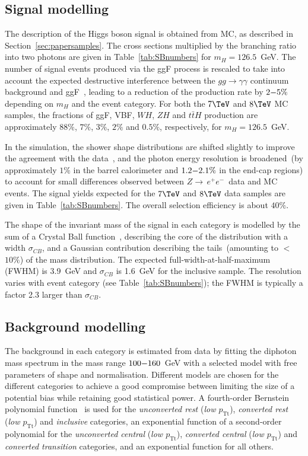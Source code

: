 \documentclass[final,3p,times,twocolumn]{elsarticle}
\newcommand{\ptt}{\ensuremath{p_{\mathrm{Tt}}}}
\newcommand{\ztoee}{\ensuremath{Z{\rightarrow\,}e^+e^-}}
\begin{document}
\subsection{Signal modelling}
The description of the Higgs boson signal is obtained from MC, as described in Section~\ref{sec:papersamples}.
The cross sections multiplied by the branching ratio into two photons are given in Table~\ref{tab:SBnumbers} for $m_H=126.5$~GeV.
The number of signal events produced via the ggF process is rescaled to take into account
the expected destructive interference between the $gg\to\gamma\gamma$\; continuum background and ggF~\cite{Dixon:2003yb},
leading to a reduction of the production rate by $2{\--}5\%$ depending on $m_H$ and the event category.
For both the $7\TeV$ and $8\TeV$ MC samples,
the fractions of ggF, VBF, $WH$, $ZH$ and $t\bar{t}H$ production are approximately $88\%$, $7\%$, $3\%$, $2\%$ and $0.5\%$, respectively, for $m_H=126.5$~GeV.

In the simulation, the shower shape distributions are shifted slightly to improve the agreement with the data~\cite{Aad:2010sp},
and the photon energy resolution is broadened~(by approximately $1\%$ in the barrel calorimeter and $1.2{\--}2.1\%$ in the end-cap regions) to account for small differences observed between \ztoee\ data and MC events.
The signal yields expected for the $7\TeV$ and $8\TeV$ data samples are given in Table~\ref{tab:SBnumbers}.
The overall selection efficiency is about $40\%$.

The shape of the invariant mass of the signal in each category is modelled by the sum of a Crystal Ball function~\cite{CSB},
describing the core of the distribution with a width $\sigma_{CB}$,
and a Gaussian contribution describing the tails~(amounting to $<$$10\%$) of the mass distribution.
The expected full-width-at-half-maximum (FWHM) is 3.9~GeV and $\sigma_{CB}$ is 1.6~GeV for the inclusive sample.
The resolution varies with event category (see Table~\ref{tab:SBnumbers}); the FWHM is typically a factor 2.3 larger
than $\sigma_{CB}$.

\subsection{Background modelling}
The background in each category is estimated from data by fitting the
diphoton mass spectrum in the mass range $100{\--}160$~GeV with a
selected model with free parameters of shape and normalisation.
Different models are chosen for the different categories to achieve a
good compromise between limiting the size of a potential bias
while retaining good statistical
power.  A fourth-order Bernstein polynomial function~\cite{Bernstein} is used for the
\emph{unconverted rest} (\emph{low \ptt}), \emph{converted rest} (\emph{low \ptt}) and
\emph{inclusive} categories, an exponential function of a second-order
polynomial for the \emph{unconverted central} (\emph{low \ptt}), \emph{converted central}
(\emph{low \ptt}) and \emph{converted transition} categories, and an exponential
function for all others.
\end{document}
